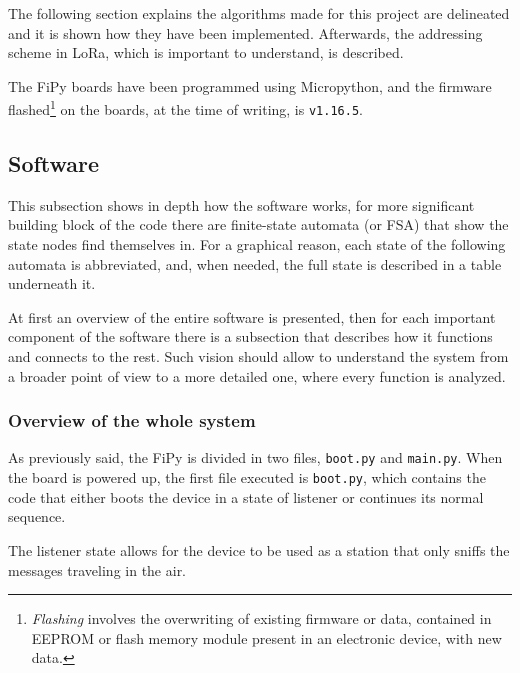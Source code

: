		The following section explains the algorithms made for this project are delineated and it is shown how they have been implemented.
		Afterwards, the addressing scheme in LoRa, which is important to understand, is described.
		
		The FiPy boards have been programmed using Micropython, and the firmware flashed\footnote{ \textit{Flashing} involves the overwriting of existing firmware or data, contained in EEPROM or flash memory module present in an electronic device, with new data.} on the boards, at the time of writing, is \texttt{v1.16.5}.
		
		\subsection{Software}\label{subsec:algorithms}
	
			

			This subsection shows in depth how the software works, for more significant building block of the code there are finite-state automata (or FSA) that show the state nodes find themselves in.
			For a graphical reason, each state of the following automata is abbreviated, and, when needed, the full state is described in a table underneath it.
			
			At first an overview of the entire software is presented, then for each important component of the software there is a subsection that describes how it functions and connects to the rest.
			Such vision should allow to understand the system from a broader point of view to a more detailed one, where every function is analyzed.
			
			\subsubsection{Overview of the whole system}
			
				As previously said, the FiPy is divided in two files, \texttt{boot.py} and \texttt{main.py}.
				When the board is powered up, the first file executed is \texttt{boot.py}, which contains the code that either boots the device in a state of listener or continues its normal sequence.
				
				The listener state allows for the device to be used as a station that only sniffs the messages traveling in the air.
				

